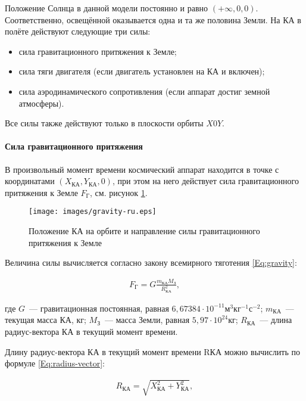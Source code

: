 \documentclass[12pt,a4paper]{article}
\begin{document}
Положение Солнца в данной модели постоянно и равно $(+\infty, 0, 0)$. Соответственно, освещённой
оказывается одна и та же половина Земли. На КА в полёте действуют следующие три силы:

\begin{itemize}
\item сила гравитационного притяжения к Земле;
\item сила тяги двигателя (если двигатель установлен на КА и включен);
\item сила аэродинамического сопротивления (если аппарат достиг земной атмосферы).
\end{itemize}

Все силы также действуют только в плоскости орбиты $X0Y$.

\paragraph{Сила гравитационного притяжения}

В произвольный момент времени космический аппарат находится в точке с координатами $(X_{\text{КА}},
Y_{\text{КА}}, 0)$, при этом на него действует сила гравитационного притяжения к Земле $F_{\text{Г}}$,
см. рисунок \ref{Pic:Gravity}.

\begin{figure}[tbh]
  \begin{center}
    \texttt{[image: images/gravity-ru.eps]}
    \caption{Положение КА на орбите и направление силы гравитационного притяжения к Земле}
    \label{Pic:Gravity}
  \end{center}
\end{figure}

Величина силы вычисляется согласно закону всемирного тяготения \ref{Eq:gravity}:

\begin{eqnarray}
  F_{\text{Г}} = G \frac{m_{\text{КА}} M_{\text{З}}}{R_{\text{КА}}^2}, \label{Eq:gravity}
\end{eqnarray}

где $G$~--- гравитационная постоянная, равная $6,67384 \cdot 10^{-11} \text{м}^3
\text{кг}^{-1} \text{с}^{-2}$; $m_{\text{КА}}$~--- текущая масса КА, кг; $M_{\text{З}}$~--–
масса Земли, равная $5,97 \cdot 10^{24} \text{кг}$; $R_{\text{КА}}$~--– длина радиус-вектора
КА в текущий момент времени.

Длину радиус-вектора КА в текущий момент времени RКА можно вычислить по формуле
\ref{Eq:radius-vector}:

\begin{eqnarray}
  R_{\text{КА}} = \sqrt{X_{\text{КА}}^2 + Y_{\text{КА}}^2}, \label{Eq:radius-vector}
\end{eqnarray}
\end{document}
